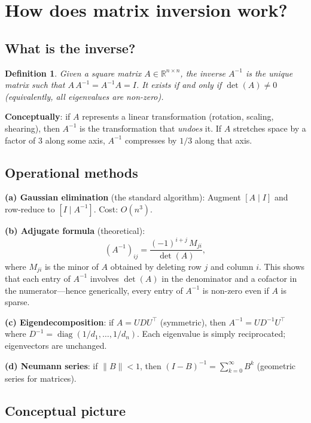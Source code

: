 \documentclass[11pt,a4paper]{article}
\newtheorem{definition}[theorem]{Definition}
\newcommand{\R}{\mathbb{R}}
\newcommand{\diag}{\operatorname{diag}}
\begin{document}
\section{How does matrix inversion work?}
\label{sec:q9}

\subsection{What is the inverse?}

\begin{definition}
Given a square matrix $A \in \R^{n \times n}$, the \emph{inverse} $A^{-1}$ is the unique matrix such that $A\,A^{-1} = A^{-1}A = I$.  It exists if and only if $\det(A) \neq 0$ (equivalently, all eigenvalues are non-zero).
\end{definition}

\textbf{Conceptually}: if $A$ represents a linear transformation (rotation, scaling, shearing), then $A^{-1}$ is the transformation that \emph{undoes} it.  If $A$ stretches space by a factor of 3 along some axis, $A^{-1}$ compresses by $1/3$ along that axis.

\subsection{Operational methods}

\textbf{(a) Gaussian elimination} (the standard algorithm):  Augment $[A \mid I]$ and row-reduce to $[I \mid A^{-1}]$.  Cost: $O(n^3)$.

\textbf{(b) Adjugate formula} (theoretical):
\begin{equation}
  (A^{-1})_{ij} = \frac{(-1)^{i+j}\,M_{ji}}{\det(A)},
\end{equation}
where $M_{ji}$ is the minor of $A$ obtained by deleting row $j$ and column $i$.  This shows that each entry of $A^{-1}$ involves $\det(A)$ in the denominator and a cofactor in the numerator---hence generically, every entry of $A^{-1}$ is non-zero even if $A$ is sparse.

\textbf{(c) Eigendecomposition}: if $A = UDU^\top$ (symmetric), then $A^{-1} = UD^{-1}U^\top$ where $D^{-1} = \diag(1/d_1, \dots, 1/d_n)$.  Each eigenvalue is simply reciprocated; eigenvectors are unchanged.

\textbf{(d) Neumann series}: if $\|B\| < 1$, then $(I - B)^{-1} = \sum_{k=0}^{\infty} B^k$ (geometric series for matrices).

\subsection{Conceptual picture}
\end{document}
